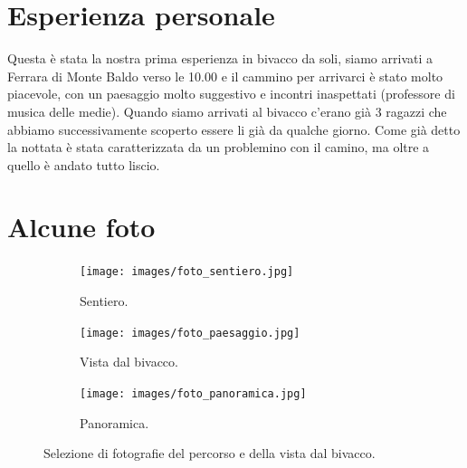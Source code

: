 \documentclass{article}
\begin{document}
\section{Esperienza personale}
Questa è stata la nostra prima esperienza in bivacco da soli, siamo arrivati a Ferrara di Monte Baldo verso le 10.00 e il cammino per arrivarci è stato molto piacevole, con un paesaggio molto suggestivo e incontri inaspettati (professore di musica delle medie). Quando siamo arrivati al bivacco c'erano già 3 ragazzi che abbiamo successivamente scoperto essere li già da qualche giorno. Come già detto la nottata è stata caratterizzata da un problemino con il camino, ma oltre a quello è andato tutto liscio. 


\section{Alcune foto}

\begin{figure}[htbp!]
    \centering
    \begin{subfigure}[b]{0.45\textwidth}
        \texttt{[image: images/foto\_sentiero.jpg]}
        \caption{Sentiero.}
        \label{fig:prima_foto}
    \end{subfigure}
    \hfill
    \begin{subfigure}[b]{0.45\textwidth}
        \texttt{[image: images/foto\_paesaggio.jpg]}
        \caption{Vista dal bivacco.}
        \label{fig:seconda_foto}
    \end{subfigure}

    \vspace{1em} %
    \begin{subfigure}[b]{\textwidth}
        \texttt{[image: images/foto\_panoramica.jpg]}
        \caption{Panoramica.}
        \label{fig:terza_foto}
    \end{subfigure}
    \caption{Selezione di fotografie del percorso e della vista dal bivacco.}
    \label{fig:foto}
\end{figure}
\end{document}
